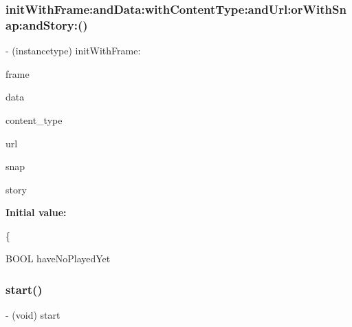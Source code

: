 \hypertarget{interface_story_snap_view_controller_a68cc9ae68e9c4c500b5f1a10460e592c}{}\label{interface_story_snap_view_controller_a68cc9ae68e9c4c500b5f1a10460e592c} 
\subsubsection{\texorpdfstring{init\+With\+Frame\+:and\+Data\+:with\+Content\+Type\+:and\+Url\+:or\+With\+Snap\+:and\+Story\+:()}{initWithFrame:andData:withContentType:andUrl:orWithSnap:andStory:()}}
{\footnotesize\ttfamily -\/ (instancetype) init\+With\+Frame\+: \begin{DoxyParamCaption}\item[{(C\+G\+Rect)}]{frame }\item[{andData:(N\+S\+Data $\ast$)}]{data }\item[{withContentType:(int)}]{content\+\_\+type }\item[{andUrl:(N\+S\+U\+RL $\ast$)}]{url }\item[{orWithSnap:(\hyperlink{interface_snap}{Snap} $\ast$)}]{snap }\item[{andStory:(\hyperlink{interface_story}{Story} $\ast$)}]{story }\end{DoxyParamCaption}}

{\bfseries Initial value\+:}
\begin{DoxyCode}
\{

    BOOL haveNoPlayedYet
\end{DoxyCode}
\hypertarget{interface_story_snap_view_controller_a200191dfbc2ff52cd6d279581ceb1d1a}{}\label{interface_story_snap_view_controller_a200191dfbc2ff52cd6d279581ceb1d1a} 
\subsubsection{\texorpdfstring{start()}{start()}}
{\footnotesize\ttfamily -\/ (void) start \begin{DoxyParamCaption}{ }\end{DoxyParamCaption}}



